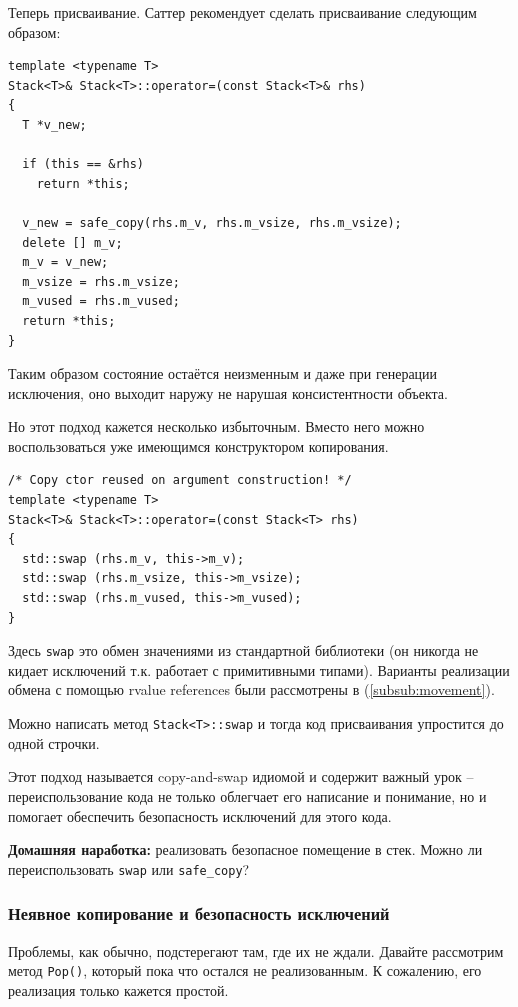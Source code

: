\documentclass[a4paper,12pt,oneside]{article}
\begin{document}
Теперь присваивание. Саттер рекомендует сделать присваивание следующим образом:

\begin{lstlisting}
template <typename T>
Stack<T>& Stack<T>::operator=(const Stack<T>& rhs)
{
  T *v_new;

  if (this == &rhs)
    return *this;

  v_new = safe_copy(rhs.m_v, rhs.m_vsize, rhs.m_vsize);
  delete [] m_v;
  m_v = v_new;
  m_vsize = rhs.m_vsize; 
  m_vused = rhs.m_vused;
  return *this;
}
\end{lstlisting}

Таким образом состояние остаётся неизменным и даже при генерации исключения, оно выходит наружу не нарушая консистентности объекта.

Но этот подход кажется несколько избыточным. Вместо него можно воспользоваться уже имеющимся конструктором копирования.

\begin{lstlisting}
/* Copy ctor reused on argument construction! */
template <typename T>
Stack<T>& Stack<T>::operator=(const Stack<T> rhs)
{
  std::swap (rhs.m_v, this->m_v);
  std::swap (rhs.m_vsize, this->m_vsize);
  std::swap (rhs.m_vused, this->m_vused);
}
\end{lstlisting}

Здесь \lstinline!swap! это обмен значениями из стандартной библиотеки (он никогда не кидает исключений т.к. работает с примитивными типами). Варианты реализации обмена с помощью rvalue references были рассмотрены в (\ref{subsub:movement}).

Можно написать метод \lstinline!Stack<T>::swap! и тогда код присваивания упростится до одной строчки.

Этот подход называется copy-and-swap идиомой и содержит важный урок -- переиспользование кода не только облегчает его написание и понимание, но и помогает обеспечить безопасность исключений для этого кода.

\textbf{Домашняя наработка:} реализовать безопасное помещение в стек. Можно ли переиспользовать \lstinline!swap! или \lstinline!safe_copy!?

\subsubsection{Неявное копирование и безопасность исключений}\label{ImplicitCopy}

Проблемы, как обычно, подстерегают там, где их не ждали. Давайте рассмотрим метод \lstinline!Pop()!, который пока что остался не реализованным. К сожалению, его реализация только кажется простой.
\end{document}
